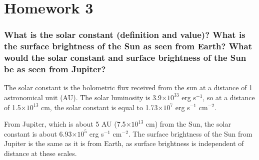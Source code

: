 \documentclass[12pt]{article}
\begin{document}


\section*{Homework 3}
\subsubsection*{What is the solar constant (definition and value)?
    What is the surface brightness of the Sun as seen from Earth?
    What would the solar constant and surface brightness of the Sun
    be as seen from Jupiter?}

    The solar constant is the bolometric flux received from the sun at a
    distance of 1 astronomical unit (AU)\cite{kuhn}.
    The solar luminosity is 3.9$\times10^{33}$ erg s$^{-1}$, so at a distance of
    1.5$\times10^{13}$ cm, the solar constant is equal to
    1.73$\times10^7$ erg s$^{-1}$ cm$^{-2}$.

    From Jupiter, which is about 5 AU (7.5$\times10^{13}$ cm) from the Sun,
    the solar constant is about 6.93$\times10^5$ erg s$^{-1}$ cm$^{-2}$.
    The surface brightness of the Sun from Jupiter
    is the same as it is from Earth, as
    surface brightness is independent of distance at these scales.


\end{document}
